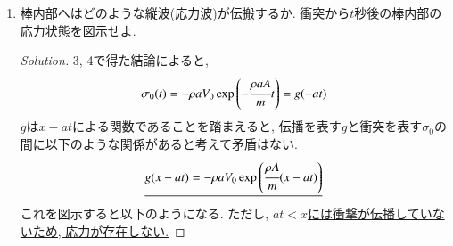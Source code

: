 \documentclass[12pt]{jsarticle}
\newenvironment{solution}
  {\renewcommand\qedsymbol{$\blacksquare$}\begin{proof}[Solution]}
  {\end{proof}}
\begin{document}
\begin{enumerate}
\begin{proof}
\begin{eqnarray*}
\cfrac{\partial^2 \sigma}{\partial t^2} &=& \cfrac{\partial(x-at)}{\partial t}\cfrac{\partial}{\partial(x-at)}\left(\cfrac{\partial \sigma}{\partial t}\right) = -a\cfrac{\partial}{\partial(x-at)}\left(\cfrac{\partial (x-at)}{\partial t}\cfrac{\partial g}{\partial (x-at)}\right) = a^2\cfrac{\partial^2 g}{\partial (x-at)^2} \\
\cfrac{\partial^2 \sigma}{\partial x^2} &=&\cfrac{\partial(x-at)}{\partial x}\cfrac{\partial}{\partial(x-at)}\left(\cfrac{\partial \sigma}{\partial x}\right) = \cfrac{\partial}{\partial(x-at)}\left(\cfrac{\partial (x-at)}{\partial x}\cfrac{\partial g}{\partial (x-at)}\right) = \cfrac{\partial^2 g}{\partial (x-at)^2}
\end{eqnarray*}
以上より, 確かに運動方程式の解として正しい.
\end{proof}
\item 棒内部へはどのような縦波(応力波)が伝搬するか. 衝突から$t$秒後の棒内部の応力状態を図示せよ.
\begin{solution}
3, 4で得た結論によると,
\begin{eqnarray*}
\sigma_0(t)=-\rho aV_0\exp\left(-\cfrac{\rho aA}{m}t \right) = g(-at)
\end{eqnarray*}
$g$は$x-at$による関数であることを踏まえると, 伝播を表す$g$と衝突を表す$\sigma_0$の間に以下のような関係があると考えて矛盾はない.
\begin{eqnarray*}
\underline{g(x-at) = -\rho a V_0\exp\left(\cfrac{\rho A}{m}(x-at) \right)}
\end{eqnarray*}
これを図示すると以下のようになる. ただし, \underline{$at<x$には衝撃が伝播していないため, 応力が存在しない.}
\end{solution}
\end{enumerate}
\newpage
\end{document}
